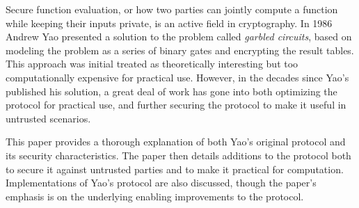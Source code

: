 Secure function evaluation, or how two parties can jointly compute a function while keeping their inputs private, is an active field in cryptography. In 1986 Andrew Yao presented a solution to the problem called \emph{garbled circuits}, based on modeling the problem as a series of binary gates and encrypting the result tables. This approach was initial treated as theoretically interesting but too computationally expensive for practical use.  However, in the decades since Yao's published his solution, a great deal of work has gone into both optimizing the protocol for practical use, and further securing the protocol to make it useful in untrusted scenarios.

This paper provides a thorough explanation of both Yao's original protocol and its security characteristics.  The paper then details additions to the protocol both to secure it against untrusted parties and to make it practical for computation.  Implementations of Yao's protocol are also discussed, though the paper's emphasis is on the underlying enabling improvements to the protocol.
